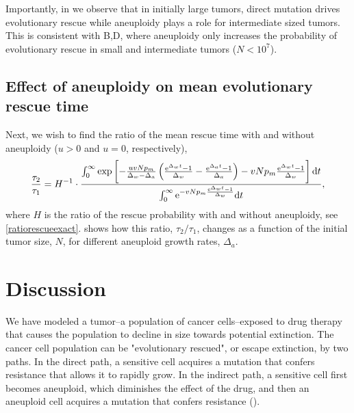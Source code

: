 \documentclass[12pt]{extarticle}
\renewcommand{\d}[1]{\ensuremath{\operatorname{d}\!{#1}}}
\renewcommand{\d}{{\rm d}}
\newcommand{\e}{{\rm e}}
\begin{document}
Importantly, in  we observe that in initially large tumors, direct mutation drives evolutionary rescue while aneuploidy plays a role for intermediate sized tumors. %
This is consistent with B,D, where aneuploidy only increases the probability of evolutionary rescue in small and intermediate tumors ($N<10^7$).

\subsection*{Effect of aneuploidy on mean evolutionary rescue time}

Next, we wish to find the ratio of the mean rescue time with and without aneuploidy ($u>0$ and $u=0$, respectively),
\begin{align}\label{eqMeanTimeRatioInitialPopulationSize}
\frac{\tau_2}{\tau_1}  
= H^{-1} \cdot \frac{\int_0^\infty\exp\left[-\frac{uvNp_m}{\Delta_w-\Delta_a}\left(\frac{\e^{\Delta_wt}-1}{\Delta_w}-\frac{\e^{\Delta_at}-1}{\Delta_a}\right)-vNp_m\frac{\e^{\Delta_w t}-1}{\Delta_w}\right] \d t}{\int_0^\infty\e^{-vNp_m\frac{\e^{\Delta_w t}-1}{\Delta_w}} \d t},
\end{align}
where $H$ is the ratio of the rescue probability with and without aneuploidy, see \cref{ratiorescueexact}.
 shows how this ratio, $\tau_2/\tau_1$, changes as a function of the initial tumor size, $N$, for different aneuploid growth rates, $\Delta_a$.

\section*{Discussion}

We have modeled a tumor--a population of cancer cells--exposed to drug therapy that causes the population to decline in size towards potential extinction.
The cancer cell population can be "evolutionary rescued", or escape extinction, by two paths. In the direct path, a sensitive cell acquires a mutation that confers resistance that allows it to rapidly grow. In the indirect path, a sensitive cell first becomes aneuploid, which diminishes the effect of the drug, and then an aneuploid cell acquires a mutation that confers resistance ().
\end{document}

